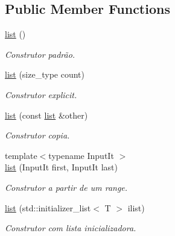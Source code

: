 \subsection*{Public Member Functions}
\begin{DoxyCompactItemize}
\item 
\mbox{\label{classsc_1_1list_ac7b95807230114dc58f2b1156cb3cdba}} 
\hyperlink{classsc_1_1list_ac7b95807230114dc58f2b1156cb3cdba}{list} ()
\begin{DoxyCompactList}\small\item\em Construtor padrão. \end{DoxyCompactList}\item 
\mbox{\label{classsc_1_1list_a38c946e7fe092c01ea0c0fc3be19d11c}} 
\hyperlink{classsc_1_1list_a38c946e7fe092c01ea0c0fc3be19d11c}{list} (size\+\_\+type count)
\begin{DoxyCompactList}\small\item\em Construtor explicit. \end{DoxyCompactList}\item 
\mbox{\label{classsc_1_1list_a1fe5b60798e979cb0a5b1663d64ec69b}} 
\hyperlink{classsc_1_1list_a1fe5b60798e979cb0a5b1663d64ec69b}{list} (const \hyperlink{classsc_1_1list}{list} \&other)
\begin{DoxyCompactList}\small\item\em Construtor copia. \end{DoxyCompactList}\item 
\mbox{\label{classsc_1_1list_a142545a98bc5fec38606bf7000620864}} 
{\footnotesize template$<$typename Input\+It $>$ }\\\hyperlink{classsc_1_1list_a142545a98bc5fec38606bf7000620864}{list} (Input\+It first, Input\+It last)
\begin{DoxyCompactList}\small\item\em Construtor a partir de um range. \end{DoxyCompactList}\item 
\mbox{\label{classsc_1_1list_ae85152bcf538c929944790b1c30d3b22}} 
\hyperlink{classsc_1_1list_ae85152bcf538c929944790b1c30d3b22}{list} (std\+::initializer\+\_\+list$<$ T $>$ ilist)
\begin{DoxyCompactList}\small\item\em Construtor com lista inicializadora. \end{DoxyCompactList}\item 

\end{DoxyCompactItemize}
